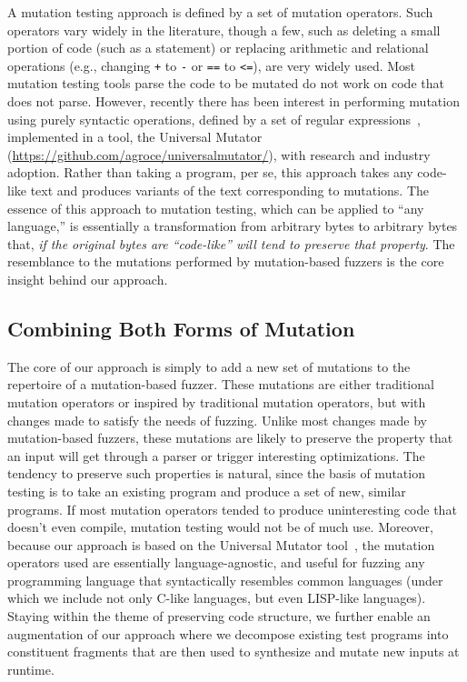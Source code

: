 A mutation testing approach is defined by a set of mutation operators.  Such operators vary widely in the literature, though a few, such as deleting a small portion of code (such as a statement) or replacing arithmetic and relational operations (e.g., changing {\tt +} to {\tt -} or {\tt ==} to {\tt <=}), are very widely used.  Most mutation testing tools parse the code to be mutated do not work on code that does not parse.  However, recently there has been interest in performing mutation using purely syntactic operations, defined by a set of regular expressions~\cite{regexpMut}, implemented in a tool, the Universal Mutator (\url{https://github.com/agroce/universalmutator/}), with research and industry adoption.  Rather than taking a program, per se, this approach takes any code-like text and produces variants of the text corresponding to mutations.  The essence of this approach to mutation testing, which can be applied to ``any language,'' is essentially a transformation from arbitrary bytes to arbitrary bytes that, \emph{if the original bytes are ``code-like'' will tend to preserve that property}.  The resemblance to the mutations performed by mutation-based fuzzers is the core insight behind our approach.

\subsection{Combining Both Forms of Mutation}

The core of our approach is simply to add a new set of mutations to the repertoire of a mutation-based fuzzer.  These mutations are either traditional mutation operators or inspired by traditional mutation operators, but with changes made to satisfy the needs of fuzzing.  Unlike most changes made by mutation-based fuzzers, these mutations are likely to preserve the property that an input will get through a parser or trigger interesting optimizations.  The tendency to preserve such properties is natural, since the basis of mutation testing is to take an existing program and produce a set of new, similar programs.  If most mutation operators tended to produce uninteresting code that doesn't even compile, mutation testing would not be of much use.  Moreover, because our approach is based on the Universal Mutator tool~\cite{regexpMut}, the mutation operators used are essentially language-agnostic, and useful for fuzzing any programming language that syntactically resembles common languages (under which we include not only C-like languages, but even LISP-like languages). Staying within the theme of preserving code structure, we further enable an augmentation of our approach where we decompose existing test programs into constituent fragments that are then used to synthesize and mutate new inputs at runtime.

